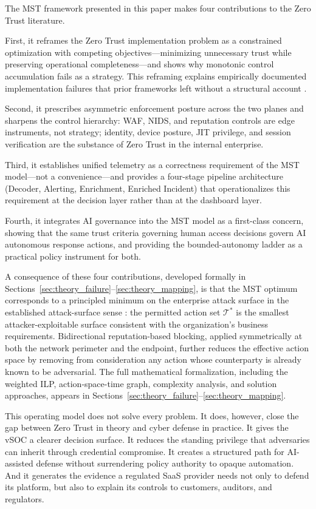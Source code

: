 \documentclass[acmlarge]{acmart}
\begin{document}
The MST framework presented in this paper makes four contributions to the Zero Trust
literature.

First, it reframes the Zero Trust implementation problem as a constrained optimization
with competing objectives---minimizing unnecessary trust while preserving operational
completeness---and shows why monotonic control accumulation fails as a strategy.
This reframing explains empirically documented implementation failures that prior
frameworks left without a structural account \cite{buck2021}.

Second, it prescribes asymmetric enforcement posture across the two planes and
sharpens the control hierarchy: WAF, NIDS, and reputation controls are edge
instruments, not strategy; identity, device posture, JIT privilege, and session
verification are the substance of Zero Trust in the internal enterprise.

Third, it establishes unified telemetry as a correctness requirement of the MST
model---not a convenience---and provides a four-stage pipeline architecture
(Decoder, Alerting, Enrichment, Enriched Incident) that operationalizes this
requirement at the decision layer rather than at the dashboard layer.

Fourth, it integrates AI governance into the MST model as a first-class concern,
showing that the same trust criteria governing human access decisions govern AI
autonomous response actions, and providing the bounded-autonomy ladder as a
practical policy instrument for both.

A consequence of these four contributions, developed formally in
Sections~\ref{sec:theory_failure}--\ref{sec:theory_mapping}, is that the MST optimum corresponds to a principled
minimum on the enterprise attack surface in the established attack-surface sense \cite{manadhata2011}: the permitted action set $\mathcal{T}^{*}$ is the smallest
attacker-exploitable surface consistent with the organization's business requirements.
Bidirectional reputation-based blocking, applied symmetrically at both the network
perimeter and the endpoint, further reduces the effective action space by removing
from consideration any action whose counterparty is already known to be adversarial.
The full mathematical formalization, including the weighted ILP, action-space-time
graph, complexity analysis, and solution approaches, appears in
Sections~\ref{sec:theory_failure}--\ref{sec:theory_mapping}.

This operating model does not solve every problem. It does, however, close the gap between
Zero Trust in theory and cyber defense in practice. It gives the vSOC a clearer decision
surface. It reduces the standing privilege that adversaries can inherit through credential
compromise. It creates a structured path for AI-assisted defense without surrendering policy
authority to opaque automation. And it generates the evidence a regulated SaaS provider
needs not only to defend its platform, but also to explain its controls to customers,
auditors, and regulators.
\end{document}
